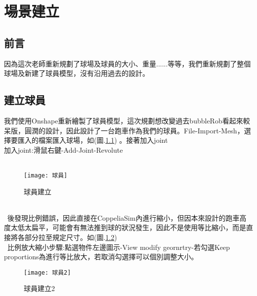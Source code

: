 \chapter{場景建立}
\section{前言}
因為這次老師重新規劃了球場及球員的大小、重量......等等，我們重新規劃了整個球場及新建了球員模型，沒有沿用過去的設計。\\
\section{建立球員}
我們使用Onshape重新繪製了球員模型，這次規劃想改變過去bubbleRob看起來較呆版，圓潤的設計，因此設計了一台跑車作為我們的球員。File-Import-Mesh，選擇要匯入的檔案匯入球場，如(圖.\ref{球員建立}) 。接著加入joint\\
加入joint:滑鼠右鍵-Add-Joint-Revolute\\
\
\begin{figure}[hbt!]
\begin{center}
\texttt{[image: 球員]}
\caption{\Large 球員建立}\label{球員建立}
\end{center}
\end{figure}
\\
\
後發現比例錯誤，因此直接在CoppeliaSim內進行縮小，但因本來設計的跑車高度太低太扁平，可能會有無法推到球的狀況發生，因此不是使用等比縮小，而是直接將各部分拉至規定尺寸。如(圖.\ref{球員建立2})\\
\
比例放大縮小步驟:點選物件左邊圖示-View modify geornrtry-若勾選Keep proportions為進行等比放大，若取消勾選擇可以個別調整大小。\
\begin{figure}[hbt!]
\begin{center}
\texttt{[image: 球員2]}
\caption{\Large 球員建立2}\label{球員建立2}
\end{center}
\end{figure}\